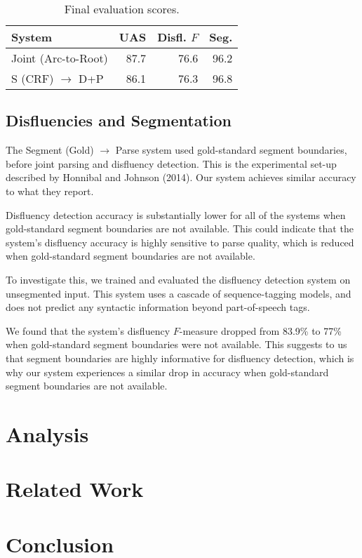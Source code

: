 \documentclass[11pt,letterpaper]{article}
\begin{document}
\begin{table}
    \centering
    \begin{tabular}{l|rrr}
        System & UAS & Disfl. $F$ & Seg. \\
        \hline \hline
        Joint (Arc-to-Root) & 87.7 & 76.6 & 96.2 \\
        S (CRF) $\rightarrow$ D+P & 86.1 & 76.3 & 96.8 \\
        \hline
    \end{tabular}
    \caption{Final evaluation scores.}
\end{table}

\subsection{Disfluencies and Segmentation}

The Segment (Gold) $\rightarrow$ Parse system used gold-standard segment boundaries,
before joint parsing and disfluency detection.  This is the experimental
set-up described by Honnibal and Johnson (2014).  Our system achieves similar
accuracy to what they report.

Disfluency detection accuracy is substantially lower for all of the systems when
gold-standard segment boundaries are not available.  This could indicate that
the system's disfluency accuracy is highly sensitive to parse quality, which
is reduced when gold-standard segment boundaries are not available.

To investigate this, we trained and evaluated the \citet{qian:13} disfluency
detection system on unsegmented input.  This system uses a cascade of
sequence-tagging models, and does not predict any syntactic information beyond
part-of-speech tags.

We found that the \citeauthor{qian:13} system's disfluency $F$-measure dropped
from 83.9\% to 77\% when gold-standard segment boundaries were not available.
This suggests to us that segment boundaries are highly informative
for disfluency detection, which is why our system experiences a similar drop
in accuracy when gold-standard segment boundaries are not available.


\clearpage

\section{Analysis}

\clearpage

\section{Related Work}

\newpage
\section{Conclusion}

\newpage



\end{document}
